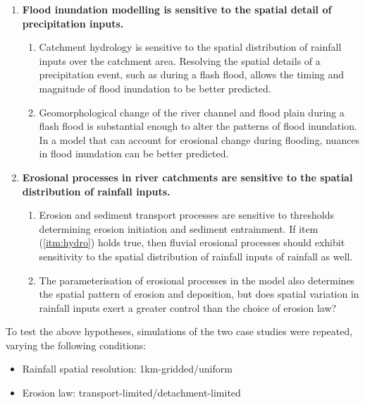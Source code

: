 \begin{enumerate}

\item \label{itm:flood} \textbf{Flood inundation modelling is sensitive to the spatial detail of precipitation inputs.}
  \begin{enumerate} 
  \item \label{itm:hydro} Catchment hydrology is sensitive to the spatial distribution of rainfall inputs over the catchment area. Resolving the spatial details of a precipitation event, such as during a flash flood, allows the timing and magnitude of flood inundation to be better predicted.
  \item Geomorphological change of the river channel and flood plain during a flash flood is substantial enough to alter the patterns of flood inundation. In a model that can account for erosional change during flooding, nuances in flood inundation can be better predicted.
  \end{enumerate}

\item \label{itm:geomorph} \textbf{Erosional processes in river catchments are sensitive to the spatial distribution of rainfall inputs.}
  \begin{enumerate}
  \item Erosion and sediment transport processes are sensitive to thresholds determining erosion initiation and sediment entrainment. If item (\ref{itm:hydro})  holds true, then fluvial erosional processes should exhibit sensitivity to the spatial distribution of rainfall inputs of rainfall as well.
  \item The parameterisation of erosional processes in the model also determines the spatial pattern of erosion and deposition, but does spatial variation in rainfall inputs exert a greater control than the choice of erosion law?
  \end{enumerate}
  
\end{enumerate} 

To test the above hypotheses, simulations of the two case studies were repeated, varying the following conditions:

\begin{itemize}
\item Rainfall spatial resolution: 1km-gridded/uniform
\item Erosion law: transport-limited/detachment-limited
\end{itemize}

